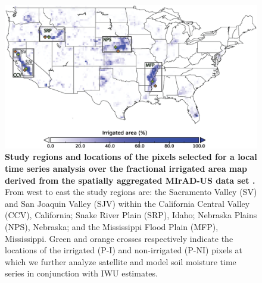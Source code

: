 \documentclass[hess, manuscript]{copernicus}
\begin{document}
\clearpage
\begin{figure}[t]
  \includegraphics[width=\textwidth]{figures/mirad25km_study_areas_v3}
  \caption{\textbf{Study regions and locations of the pixels selected for a local time series analysis over the fractional irrigated area map derived from the spatially aggregated MIrAD-US data set \citep{Pervez_2010}.} From west to east the study regions are: the Sacramento Valley (SV) and San Joaquin Valley (SJV) within the California Central Valley (CCV), California; Snake River Plain (SRP), Idaho; Nebraska Plains (NPS), Nebraska; and the Mississippi Flood Plain (MFP), Mississippi. Green and orange crosses respectively indicate the locations of the irrigated (P-I) and non-irrigated (P-NI) pixels at which we further analyze satellite and model soil moisture time series in conjunction with IWU estimates.}
  \label{fig:study-areas-over-mirad}
\end{figure}

\clearpage
\end{document}
